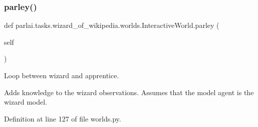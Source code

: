 \subsubsection{\texorpdfstring{parley()}{parley()}}
{\footnotesize\ttfamily def parlai.\+tasks.\+wizard\+\_\+of\+\_\+wikipedia.\+worlds.\+Interactive\+World.\+parley (\begin{DoxyParamCaption}\item[{}]{self }\end{DoxyParamCaption})}

\begin{DoxyVerb}Loop between wizard and apprentice.

Adds knowledge to the wizard observations. Assumes that the model agent is the
wizard model.
\end{DoxyVerb}
 

Definition at line 127 of file worlds.\+py.


